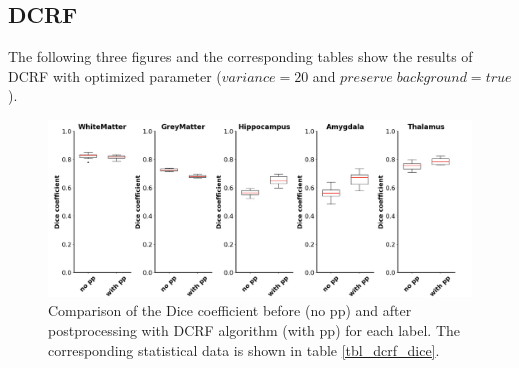 \documentclass[journal]{IEEEtran}
\begin{document}
\subsection{DCRF}
The following three figures and the corresponding tables show the results of DCRF with optimized parameter ($variance = 20$ and $preserve\; background = true$).
\begin{figure}[ht]
\centering
\includegraphics[width=\textwidth]{img/boxplots/DCRF-DICE.png}
\caption{Comparison of the Dice coefficient before (no pp) and after postprocessing with DCRF algorithm (with pp) for each label. The corresponding statistical data is shown in table \ref{tbl_dcrf_dice}.}
\label{fig_dcrf_dice}
\end{figure}
\end{document}
